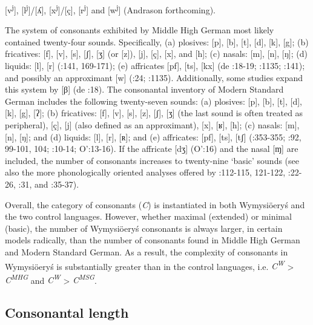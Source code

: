 \documentclass[output=paper]{langscibook}
\begin{document}
[v\textsuperscript{j}], [l\textsuperscript{j}]/[ʎ], [x\textsuperscript{j}]/[ç], [r\textsuperscript{j}] and [w\textsuperscript{j}] (Andrason forthcoming).

The system of consonants exhibited by Middle High German most likely contained twenty-four sounds. Specifically, (a) plosives: [p], [b], [t], [d], [k], [g]; (b) fricatives: [f], [v], [s], [ʃ], [ʒ] (or [z]), [j], [ç], [x], and [h]; (c) nasals: [m], [n], [ŋ]; (d) liquids: [l], [r] (\citealt{Paul2007}:141, 169-171); (e) affricates [pf], [ts], [kx] (de \citealt{BoorWisniewski1973}:18-19; \citealt{Simmler1985}:1135; \citealt{Paul2007}:141); and possibly an approximant [w] (\citealt{Wright1917}:24; \citealt{Simmler1985}:1135). Additionally, some studies expand this system by [β] (de \citealt{BoorWisniewski1973}:18). The consonantal inventory of Modern Standard German includes the following twenty-seven sounds: (a) plosives: [p], [b], [t], [d], [k], [g], [ʔ]; (b) fricatives: [f], [v], [s], [z], [ʃ], [ʒ] (the last sound is often treated as peripheral), [ç], [j] (also defined as an approximant), [x], [ʁ], [h]; (c) nasals: [m], [n], [ŋ]; and (d) liquids: [l], [r], [ʀ]; and (e) affricates: [pf], [ts], [tʃ] (\citealt{Eisenberg1994}:353-355; \citealt{JohnsonBraber2008}:92, 99-101, 104; \citealt{Fagan2009}:10-14; O’\citealt{BrienFagan2016}:13-16). If the affricate [dʒ] (O’\citealt{BrienFagan2016}:16) and the nasal [ɱ] \citep{Hall2000} are included, the number of consonants increases to twenty-nine ‘basic’ sounds (see also the more phonologically oriented analyses offered by \citealt{Russ1994}:112-115, 121-122, \citealt{Wiese1998}:22-26, \citealt{Hall2000}:31, and \citealt{Fox2005}:35-37).

Overall, the category of consonants (\textit{C}) is instantiated in both Wymysiöeryś and the two control languages. However, whether maximal (extended) or minimal (basic), the number of Wymysiöeryś consonants is always larger, in certain models radically, than the number of consonants found in Middle High German and Modern Standard German. As a result, the complexity of consonants in Wymysiöeryś is substantially greater than in the control languages, i.e. \textit{C\textsuperscript{W}} > \textit{C\textsuperscript{MHG}} and \textit{C\textsuperscript{W}} > \textit{C\textsuperscript{MSG}}.

\subsection{Consonantal length}\label{sec:wymsorys:3.8}
\end{document}
